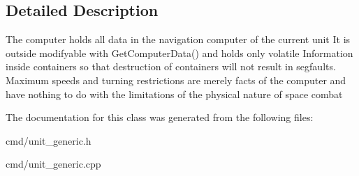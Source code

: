\subsection{Detailed Description}
The computer holds all data in the navigation computer of the current unit It is outside modifyable with Get\+Computer\+Data() and holds only volatile Information inside containers so that destruction of containers will not result in segfaults. Maximum speeds and turning restrictions are merely facts of the computer and have nothing to do with the limitations of the physical nature of space combat 

The documentation for this class was generated from the following files\+:\begin{DoxyCompactItemize}
\item 
cmd/unit\+\_\+generic.\+h\item 
cmd/unit\+\_\+generic.\+cpp\end{DoxyCompactItemize}
